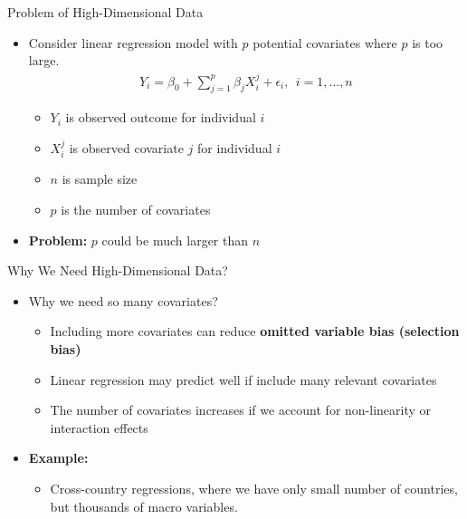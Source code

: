 \documentclass[hyperref={pdfpagelabels=false}]{beamer}
\begin{document}
	

	
	
	
	\begin{frame}{Problem of High-Dimensional Data}
		\begin{itemize}
			\item Consider linear regression model with $p$ potential covariates where $p$ is too large.
			\vspace{0.2cm}
			\begin{eqnarray*}
				Y_{i} = \beta_{0} + \sum^{p}_{j=1} \beta_{j} X^{j}_{i}  + \epsilon_{i}, 
			 \ \ i=1, \ldots ,n
			\end{eqnarray*}
			
			\begin{itemize}
				\item $Y_{i}$ is observed outcome for individual $i$ 
				\vspace{0.2cm}
				\item $X^{j}_{i}$ is observed covariate $j$ for individual $i$ 
				\vspace{0.2cm}
				\item $n$ is sample size
				\vspace{0.2cm}
				\item $p$ is the number of covariates
				\vspace{0.2cm}
			\end{itemize}
			\item \textbf{Problem:} $p$ could be much larger than $n$
		\end{itemize}
	\end{frame}
	
	
	
	
	\begin{frame}{Why We Need High-Dimensional Data?}
		\begin{itemize}
			\item Why we need so many covariates? 
			\vspace{0.2cm}
			\begin{itemize}
				\item Including more covariates can reduce \textbf{omitted variable bias (selection bias)}	
				\vspace{0.2cm}
				\item Linear regression may predict well if include many relevant covariates
					\vspace{0.2cm}
				\item The number of covariates increases if we account for non-linearity or interaction effects
			\end{itemize}
		\item \textbf{Example:} 
							\vspace{0.2cm}
					\begin{itemize}
		\item Cross-country regressions, where we have only small number of
		countries, but thousands of macro variables.	
					\end{itemize}
		\end{itemize}
	\end{frame}
	
\end{document}
